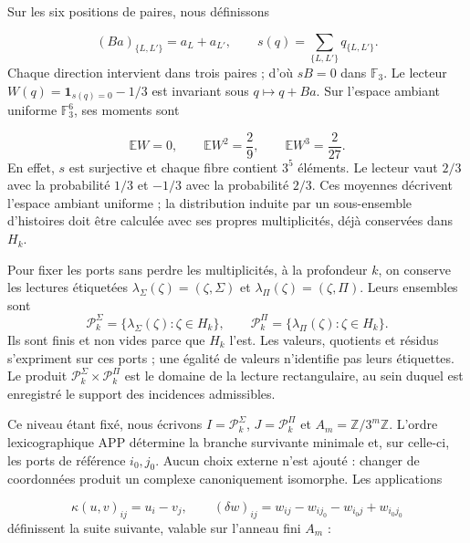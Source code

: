 Sur les six positions de paires, nous définissons

\[
(Ba)_{\{L,L'\}}=a_L+a_{L'},
\qquad
s(q)=\sum_{\{L,L'\}}q_{\{L,L'\}}.
\]
Chaque direction intervient dans trois paires ; d'où \(sB=0\) dans \(\mathbb F_3\). Le lecteur \(W(q)=\mathbf1_{s(q)=0}-1/3\) est invariant sous \(q\mapsto q+Ba\). Sur l'espace ambiant uniforme \(\mathbb F_3^6\), ses moments sont

\[
\mathbb EW=0,\qquad
\mathbb EW^2=\frac29,\qquad
\mathbb EW^3=\frac2{27}.
\]
En effet, \(s\) est surjective et chaque fibre contient \(3^5\) éléments. Le lecteur vaut \(2/3\) avec la probabilité \(1/3\) et \(-1/3\) avec la probabilité \(2/3\). Ces moyennes décrivent l'espace ambiant uniforme ; la distribution induite par un sous-ensemble d'histoires doit être calculée avec ses propres multiplicités, déjà conservées dans \(H_k\).

Pour fixer les ports sans perdre les multiplicités, à la profondeur \(k\), on conserve les lectures étiquetées \(\lambda_\Sigma(\zeta)=(\zeta,\Sigma)\) et \(\lambda_\Pi(\zeta)=(\zeta,\Pi)\). Leurs ensembles sont
\[
\mathscr P_k^\Sigma=\{\lambda_\Sigma(\zeta):\zeta\in H_k\},\qquad
\mathscr P_k^\Pi=\{\lambda_\Pi(\zeta):\zeta\in H_k\}.
\]
Ils sont finis et non vides parce que \(H_k\) l’est. Les valeurs, quotients et résidus
s’expriment sur ces ports ; une égalité de valeurs n’identifie pas leurs
étiquettes. Le produit \(\mathscr P_k^\Sigma\times\mathscr P_k^\Pi\) est le
domaine de la lecture rectangulaire, au sein duquel est enregistré le support des
incidences admissibles.

Ce niveau étant fixé, nous écrivons \(I=\mathscr P_k^\Sigma\), \(J=\mathscr P_k^\Pi\) et \(A_m=\mathbb Z/3^m\mathbb Z\). L'ordre lexicographique APP détermine la branche survivante minimale et, sur celle-ci, les ports de référence \(i_0,j_0\). Aucun choix externe n'est ajouté : changer de coordonnées produit un complexe canoniquement isomorphe. Les applications

\[
\kappa(u,v)_{ij}=u_i-v_j,
\qquad
(\delta w)_{ij}=w_{ij}-w_{ij_0}-w_{i_0j}+w_{i_0j_0}
\]
définissent la suite suivante, valable sur l'anneau fini \(A_m\) :

